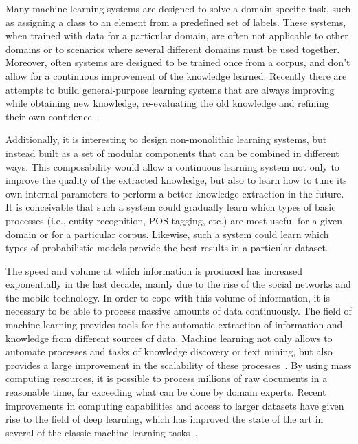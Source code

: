 Many machine learning systems are designed to solve a domain-specific task, such as
assigning a class to an element from a predefined set of labels. These systems,
when trained with data for a particular domain, are often not applicable to other domains
or to scenarios where several different domains must be used together. Moreover,
often systems are designed to be trained once from a corpus, and don't allow for
a continuous improvement of the knowledge learned.
Recently there are attempts to build general-purpose learning systems that are always
improving while obtaining new knowledge, re-evaluating the old knowledge and refining their
own confidence~\cite{mitchell2015never}.

Additionally, it is interesting to design non-monolithic learning systems, but instead
built as a set of modular components that can be combined in different ways.
This composability would allow a continuous learning system not only to improve the
quality of the extracted knowledge, but also to learn how to tune its own internal
parameters to perform a better knowledge extraction in the future. It is conceivable
that such a system could gradually learn which types of basic processes (i.e., entity recognition, POS-tagging, etc.)
are most useful for a given domain or for a particular corpus. Likewise, such a system could
learn which types of probabilistic models provide the best results in a particular dataset.

  The speed and volume at which information is produced has increased exponentially in the last decade,
   mainly due to the rise of the social networks and the mobile technology. In order to cope with this volume of information,
   it is necessary to be able to process massive amounts of data continuously.
    The field of machine learning provides tools for the automatic extraction of information and knowledge from different
    sources of data.
    Machine learning not only allows to automate processes and tasks of knowledge discovery or text mining, but also provides a large
    improvement in the scalability of these processes~\cite{wu2014data}. By using mass computing resources, it is possible to process millions
    of raw documents in a reasonable time, far exceeding what can be done by domain experts.
    Recent improvements in computing capabilities and access to larger datasets have given rise
    to the field of deep learning, which has improved the state of the art in
    several of the classic machine learning tasks~\cite{lecun2015deep}.

